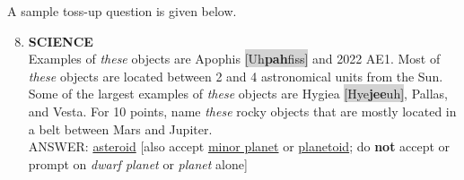 \documentclass{report}
\begin{document}
\vspace*{0.3 cm}
A sample toss-up question is given below.

\begin{mdframed}[style=sample]
\begin{enumerate}
    \setcounter{enumi}{7}
    \item \textbf{SCIENCE} \\ Examples of \textit{these} objects are Apophis \colorbox{lightGray}{[Uh\textperiodcentered\textbf{pah}\textperiodcentered fiss]} and 2022 AE1. Most of \textit{these} objects are located between 2 and 4 astronomical units from the Sun. Some of the largest examples of \textit{these} objects are Hygiea \colorbox{lightGray}{[Hye\textperiodcentered\textbf{jee}\textperiodcentered uh]}, Pallas, and Vesta. For 10 points, name \textit{these} rocky objects that are mostly located in a belt between Mars and Jupiter. \\ ANSWER: \underline{asteroid} [also accept \underline{minor planet} or \underline{planetoid}; do \textbf{not} accept or prompt on \textit{dwarf planet} or \textit{planet} alone]
\end{enumerate}
\end{mdframed}
\end{document}
